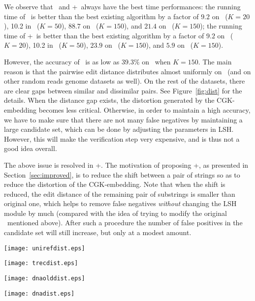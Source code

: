 We observe that \ebdjoin\ and \ebdjoin+\ always have the best time performances: the running time of \ebdjoin\ is better than the best existing algorithm by a factor of $9.2$ on \uniref\  ($K = 20$), 10.2 in \trec\ ($K = 50$), $88.7$ on \genoaa\ ($K = 150$), and $21.4$ on \genoa\ ($K = 150$);  the running time of \ebdjoin+\ is better than the best existing algorithm by a factor of $9.2$ on \uniref\  ($K = 20$), 10.2 in \trec\ ($K = 50$), $23.9$ on \genoaa\ ($K = 150$), and $5.9$ on \genoa\ ($K = 150$). 


However, the accuracy of \ebdjoin\ is as low as $39.3\%$ on \genoa\ when $K = 150$. The main reason is that the pairwise edit distance distributes almost uniformly on \genoa\ (and on other random reads genome datasets as well). On the rest of the datasets, there are clear gaps between similar and dissimilar pairs.  See Figure~\ref{fig:dist} for the details.
When the distance gap exists, the distortion generated by the CGK-embedding becomes less critical. Otherwise, in order to maintain a high accuracy, we have to make sure that there are not many false negatives by maintaining a large candidate set, which can be done by adjusting the parameters in LSH.  However, this will make the verification step very expensive, and is thus not a good idea overall.  

The above issue is resolved in \ebdjoin+.  The motivation of proposing \ebdjoin+, as presented in Section~\ref{sec:improved}, is to reduce the shift between a pair of strings so as to reduce the distortion of the CGK-embedding.  Note that when the shift is reduced, the edit distance of the remaining pair of substrings is smaller than original one, which helps to remove false negatives {\em without} changing the LSH module by much (compared with the idea of trying to modify the original \ebdjoin\ mentioned above).  After such a procedure the number of false positives in the candidate set will still increase, but only at a modest amount.





\begin{figure*}[t]
\centering
\begin{minipage}[d]{0.4\linewidth}
\centering
\texttt{[image: unirefdist.eps]}
\centerline{\uniref}
\end{minipage}
\begin{minipage}[d]{0.4\linewidth}
\centering
\texttt{[image: trecdist.eps]}
\centerline{\trec}
\end{minipage}
\begin{minipage}[d]{0.4\linewidth}
\centering
\texttt{[image: dnaolddist.eps]}
\centerline{\genoaa}
\end{minipage}
\begin{minipage}[d]{0.4\linewidth}
\centering
\texttt{[image: dnadist.eps]}
\centerline{\genoa}
\end{minipage}
\caption{Distance distribution of datasets.}
\label{fig:dist}
\end{figure*}

